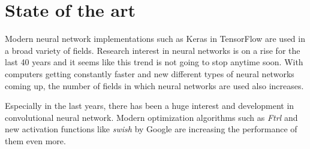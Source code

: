 \section{State of the art}
\label{sec:state-of-the-art}

Modern neural network implementations such as Keras in TensorFlow \cite{tensorflow2015-whitepaper} are used in a broad variety of fields.
Research interest in neural networks is on a rise for the last 40 years and it seems like this trend is not going to stop anytime soon.
With computers getting constantly faster and new different types of neural networks coming up, the number of fields in which neural networks are used also increases.

Especially in the last years, there has been a huge interest and development in convolutional neural network.
Modern optimization algorithms such as \emph{Ftrl} \cite{McMahan} and new activation functions like \emph{swish} \cite{DBLP:journals/corr/abs-1710-05941} by Google are increasing the performance of them even more.